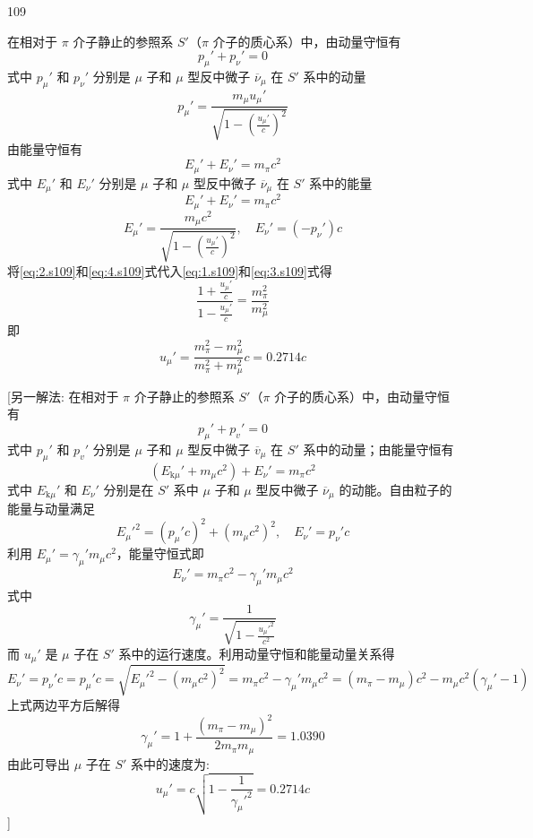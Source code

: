 \begin{solution}{109}
\begin{subsolution}
在相对于 $\pi$ 介子静止的参照系 $S'$（$\pi$ 介子的质心系）中，由动量守恒有
\begin{equation}
p_{\mu}' + p_{\nu}' = 0
\label{eq:1.s109}
\end{equation}
式中 $p_{\mu}'$ 和 $p_{\nu}'$ 分别是 $\mu$ 子和 $\mu$ 型反中微子 $\overline{\nu}_{\mu}$ 在 $S'$ 系中的动量
\begin{equation}
p_{\mu}' = \frac{m_{\mu} u_{\mu}'}{\sqrt{1 - \left(\frac{u_{\mu}'}{c}\right)^{2}}}
\label{eq:2.s109}
\end{equation}
由能量守恒有
\[
E_{\mu}' + E_{\nu}' = m_{\pi} c^{2}
\]
式中 $E_{\mu}'$ 和 $E_{\nu}'$ 分别是 $\mu$ 子和 $\mu$ 型反中微子 $\overline{\nu}_{\mu}$ 在 $S'$ 系中的能量
\begin{equation}
E_{\mu}' + E_{\nu}' = m_{\pi} c^{2}
\label{eq:3.s109}
\end{equation}
\begin{equation}
E_{\mu}' = \frac{m_{\mu} c^{2}}{\sqrt{1 - \left(\frac{u_{\mu}'}{c}\right)^{2}}},\quad E_{\nu}' = (-p_{\nu}') c
\label{eq:4.s109}
\end{equation}
将\eqref{eq:2.s109}和\eqref{eq:4.s109}式代入\eqref{eq:1.s109}和\eqref{eq:3.s109}式得
\[
\frac{1 + \frac{u_{\mu}'}{c}}{1 - \frac{u_{\mu}'}{c}} = \frac{m_{\pi}^{2}}{m_{\mu}^{2}}
\]
即
\begin{equation}
u_{\mu}' = \frac{m_{\pi}^{2} - m_{\mu}^{2}}{m_{\pi}^{2} + m_{\mu}^{2}} c = 0.2714c
\label{eq:5.s109}
\end{equation}

[另一解法:
在相对于 $\pi$ 介子静止的参照系 $S'$（$\pi$ 介子的质心系）中，由动量守恒有
\[
p_{\mu}' + p_{v}' = 0
\]
式中 $p_{\mu}'$ 和 $p_{v}'$ 分别是 $\mu$ 子和 $\mu$ 型反中微子 $\overline{v}_{\mu}$ 在 $S'$ 系中的动量；由能量守恒有
\[
(E_{\mathrm{k}\mu}' + m_{\mu} c^{2}) + E_{\nu}' = m_{\pi} c^{2}
\]
式中 $E_{\mathrm{k}\mu}'$ 和 $E_{\nu}'$ 分别是在 $S'$ 系中 $\mu$ 子和 $\mu$ 型反中微子 $\overline{\nu}_{\mu}$ 的动能。自由粒子的能量与动量满足
\[
E_{\mu}'^{2} = (p_{\mu}' c)^{2} + (m_{\mu} c^{2})^{2},\quad E_{\nu}' = p_{\nu}' c
\]
利用 $E_{\mu}' = \gamma_{\mu}' m_{\mu} c^{2}$，能量守恒式即
\[
E_{\nu}' = m_{\pi} c^{2} - \gamma_{\mu}' m_{\mu} c^{2}
\]
式中
\[
\gamma_{\mu}' = \frac{1}{\sqrt{1 - \frac{u_{\mu}'^{2}}{c^{2}}}}
\]
而 $u_{\mu}'$ 是 $\mu$ 子在 $S'$ 系中的运行速度。利用动量守恒和能量动量关系得
\[
E_{\nu}' = p_{\nu}' c = p_{\mu}' c = \sqrt{E_{\mu}'^{2} - (m_{\mu} c^{2})^{2}} = m_{\pi} c^{2} - \gamma_{\mu}' m_{\mu} c^{2} = (m_{\pi} - m_{\mu}) c^{2} - m_{\mu} c^{2} (\gamma_{\mu}' - 1)
\]
上式两边平方后解得
\[
\gamma_{\mu}' = 1 + \frac{(m_{\pi} - m_{\mu})^{2}}{2 m_{\pi} m_{\mu}} = 1.0390
\]
由此可导出 $\mu$ 子在 $S'$ 系中的速度为:
\[
u_{\mu}' = c \sqrt{1 - \frac{1}{\gamma_{\mu}'^{2}}} = 0.2714c
\]
]


\end{subsolution}
\end{solution}
